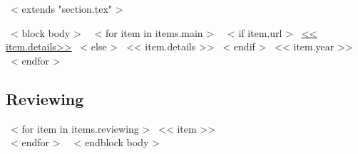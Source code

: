 ~< extends "section.tex" >~

~< block body >~
  ~< for item in items.main >~
    ~< if item.url >~
      \href{<< item.url >>}{<< item.details>>}
    ~< else >~
      << item.details >>
    ~< endif >~
    \hfill << item.year >> \\
~< endfor >~

\subsection{Reviewing}
~< for item in items.reviewing >~
<< item >> \\
~< endfor >~
~< endblock body >~